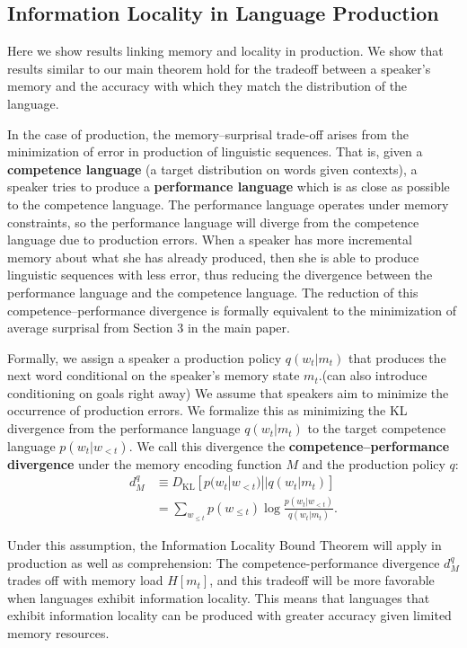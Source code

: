 \documentclass[11pt,letterpaper]{article}
\newcommand\mhahn[1]{{\color{red}(#1)}}
\newcommand{\key}[1]{\textbf{#1}}
\newcounter{theorem}
\begin{document}
\subsection{Information Locality in Language Production}

Here we show results linking memory and locality in production.
We show that results similar to our main theorem hold for the tradeoff between a speaker's memory and the accuracy with which they match the distribution of the language.

In the case of production, the memory--surprisal trade-off arises from the minimization of error in production of linguistic sequences. That is, given a \key{competence language} (a target distribution on words given contexts), a speaker tries to produce a \key{performance language} which is as close as possible to the competence language. The performance language operates under memory constraints, so the performance language will diverge from the competence language due to production errors. When a speaker has more incremental memory about what she has already produced, then she is able to produce linguistic sequences with less error, thus reducing the divergence between the performance language and the competence language. The reduction of this competence--performance divergence is formally equivalent to the minimization of average surprisal from Section 3 in the main paper.


Formally, we assign a speaker a production policy $q(w_t|m_t)$ that produces the next word conditional on the speaker's memory state $m_t$.\mhahn{can also introduce conditioning on goals right away}
We assume that speakers aim to minimize the occurrence of production errors.
We formalize this as minimizing the KL divergence from the performance language $q(w_t|m_t)$ to the target competence language $p(w_t|w_{<t})$. We call this divergence the \key{competence--performance divergence} under the memory encoding function $M$ and the production policy $q$:
    \begin{align}
    \label{eq:comp-perf-div}
    d^q_M &\equiv D_{\text{KL}} [ p(w_t|w_{<t}) || q(w_t|m_t) ] \\
        &= \sum_{w_{\le t}} p(w_{\le t}) \log \frac{p(w_t | w_{<t})}{q(w_t|m_t)}.
    \end{align}

Under this assumption, the Information Locality Bound Theorem will apply in production as well as comprehension:
The competence-performance divergence $d_M^q$ trades off with memory load $H[m_t]$, and this tradeoff will be more favorable when languages exhibit information locality.
This means that languages that exhibit information locality can be produced with greater accuracy given limited memory resources.
\end{document}
